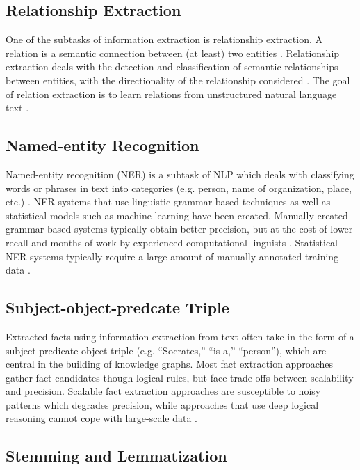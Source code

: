 \documentclass[10pt,11pt,12pt,oneside]{book}
\begin{document}
	\subsection{Relationship Extraction}
	One of the subtasks of information extraction is relationship extraction. A relation is a semantic connection between (at least) two entities \cite{orr_2013}. Relationship extraction deals with the detection and classification of semantic relationships between entities, with the directionality of the relationship considered \cite {chagoyen2006discovering}. The goal of relation extraction is to learn relations from unstructured natural language text \cite{orr_2013}.
	
	\subsection{Named-entity Recognition}
	Named-entity recognition (NER) is a subtask of NLP which deals with classifying words or phrases in text into categories (e.g. person, name of organization, place, etc.) \cite {nadeau2007survey}. NER systems that use linguistic grammar-based techniques as well as statistical models such as machine learning have been created. Manually-created grammar-based systems typically obtain better precision, but at the cost of lower recall and months of work by experienced computational linguists \cite {kapetanios2013natural}. Statistical NER systems typically require a large amount of manually annotated training data \cite {lin2009phrase}.
	
	\subsection{Subject-object-predcate Triple}
	Extracted facts using information extraction from text often take in the form of a subject-predicate-object triple (e.g. “Socrates,” “is a,” “person”), which are central in the building of knowledge graphs. Most fact extraction approaches gather fact candidates though logical rules, but face trade-offs between scalability and precision. Scalable fact extraction approaches are susceptible to noisy patterns which degrades precision, while approaches that use deep logical reasoning cannot cope with large-scale data \cite{nakashole2012automatic}.
	
	\subsection{Stemming and Lemmatization}
	
\end{document}
